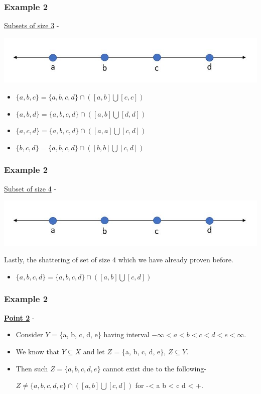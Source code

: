 \documentclass{beamer}
\begin{document}
\begin{frame}
\frametitle{Example 2}
\underline{Subsets of size 3} -\\
\begin{center}
    \includegraphics[scale=0.5]{figures/Capture7.JPG}
\end{center}
\begin{itemize}
    \item $\{a,b,c\}= \{a,b,c,d\}\cap([a,b]\bigcup[c,c])$
    \item $\{a,b,d\}= \{a,b,c,d\}\cap([a,b]\bigcup[d,d])$
    \item $\{a,c,d\}= \{a,b,c,d\}\cap([a,a]\bigcup[c,d])$
    \item $\{b,c,d\}= \{a,b,c,d\}\cap([b,b]\bigcup[c,d])$
\end{itemize}
\end{frame}

\begin{frame}
\frametitle{Example 2}
\underline{Subset of size 4} -\\
\begin{center}
    \includegraphics[scale=0.5]{figures/Capture7.JPG}
\end{center}
Lastly, the shattering of set of size 4 which we have already proven before.
\begin{itemize}
    \item $\{a,b,c,d\}= \{a,b,c,d\}\cap([a,b]\bigcup[c,d])$
\end{itemize}
\end{frame}

\begin{frame}
\frametitle{Example 2}
\textbf{\underline{Point 2}} -\\
\begin{itemize}
    \item Consider $Y$ = \{a, b, c, d, e\} having interval $-\infty < a < b < c < d < e < \infty $.
    \item We know that $Y \subseteq X$ and let $Z$ = \{a, b, c, d, e\}, $Z \subseteq Y$.
    \item Then such $Z = \{a, b, c, d, e\}$ cannot exist due to the following- 
    \begin{center}
        $Z \neq \{a, b, c, d, e\} \cap ([a,b] \bigcup [c,d])$ for -\infty < a \leq b < c \leq d < +\infty.
    \end{center}
\end{itemize}
\end{frame}
\end{document}
